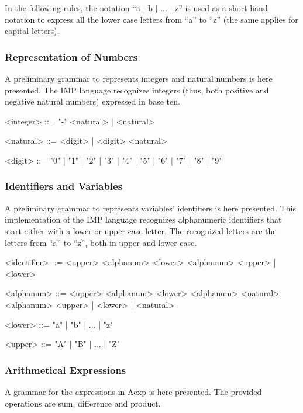 \documentclass{esposito-documentation}
\begin{document}
In the following rules, the notation ``a $\mid$ b $\mid$ ... $\mid$ z'' is used
as a short-hand notation to express all the lower case letters from ``a'' to
``z'' (the same applies for capital letters).

\subsubsection{Representation of Numbers}\label{sec:grammar-numbers}

A preliminary grammar to represents integers and natural numbers is here
presented. The IMP language recognizes integers (thus, both positive and
negative natural numbers) expressed in base ten.

\begin{grammar}
	<integer> ::= "-" <natural> | <natural>

	<natural> ::= <digit> | <digit> <natural>

	<digit> ::= "0" | "1" | "2" | "3" | "4" | "5" | "6" | "7" | "8" | "9"
\end{grammar}

\subsubsection{Identifiers and Variables}\label{sec:grammar-id}

A preliminary grammar to represents variables' identifiers is here presented.
This implementation of the IMP language recognizes alphanumeric identifiers
that start either with a lower or upper case letter. The recognized letters are
the letters from ``a'' to ``z'', both in upper and lower case.

\begin{grammar}
	<identifier> ::= <upper> <alphanum>
	\alt <lower> <alphanum>
	\alt <upper> | <lower> 
	
	<alphanum> ::= <upper> <alphanum>
	\alt <lower> <alphanum>
	\alt <natural> <alphanum>
	\alt <upper> | <lower> | <natural>

	<lower> ::= "a" | "b" | ... | "z"

	<upper> ::= "A" | "B" | ... | "Z"
\end{grammar}

\subsubsection{Arithmetical Expressions}\label{sec:grammar-aexp}

A grammar for the expressions in $\mathrm{Aexp}$ is here presented. The
provided operations are sum, difference and product.
\end{document}
